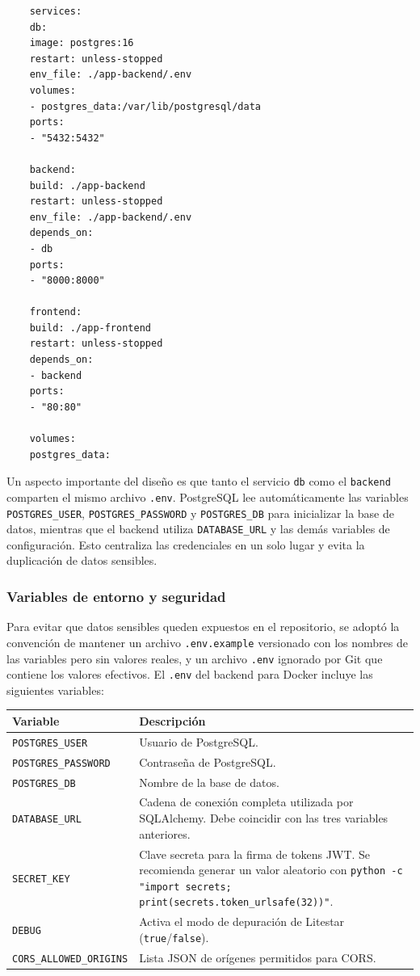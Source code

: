 \begin{lstlisting}
	services:
	db:
	image: postgres:16
	restart: unless-stopped
	env_file: ./app-backend/.env
	volumes:
	- postgres_data:/var/lib/postgresql/data
	ports:
	- "5432:5432"
	
	backend:
	build: ./app-backend
	restart: unless-stopped
	env_file: ./app-backend/.env
	depends_on:
	- db
	ports:
	- "8000:8000"
	
	frontend:
	build: ./app-frontend
	restart: unless-stopped
	depends_on:
	- backend
	ports:
	- "80:80"
	
	volumes:
	postgres_data:
\end{lstlisting}

Un aspecto importante del diseño es que tanto el servicio \texttt{db} como el \texttt{backend}
comparten el mismo archivo \texttt{.env}. PostgreSQL lee automáticamente las variables
\texttt{POSTGRES\_USER}, \texttt{POSTGRES\_PASSWORD} y \texttt{POSTGRES\_DB} para
inicializar la base de datos, mientras que el backend utiliza \texttt{DATABASE\_URL} y las
demás variables de configuración. Esto centraliza las credenciales en un solo lugar y evita
la duplicación de datos sensibles.

\subsubsection*{Variables de entorno y seguridad}

Para evitar que datos sensibles queden expuestos en el repositorio, se adoptó la convención
de mantener un archivo \texttt{.env.example} versionado con los nombres de las variables pero
sin valores reales, y un archivo \texttt{.env} ignorado por Git que contiene los valores
efectivos. El \texttt{.env} del backend para Docker incluye las siguientes variables:

\begin{center}
	\begin{tabular}{lp{9cm}}
		\hline
		\textbf{Variable} & \textbf{Descripción} \\
		\hline
		\texttt{POSTGRES\_USER}           & Usuario de PostgreSQL. \\
		\texttt{POSTGRES\_PASSWORD}       & Contraseña de PostgreSQL. \\
		\texttt{POSTGRES\_DB}             & Nombre de la base de datos. \\
		\texttt{DATABASE\_URL}            & Cadena de conexión completa utilizada por SQLAlchemy.
		Debe coincidir con las tres variables anteriores. \\
		\texttt{SECRET\_KEY}              & Clave secreta para la firma de tokens JWT.
		Se recomienda generar un valor aleatorio con
		\texttt{python -c "import secrets;
			print(secrets.token\_urlsafe(32))"}. \\
		\texttt{DEBUG}                    & Activa el modo de depuración de Litestar
		(\texttt{true}/\texttt{false}). \\
		\texttt{CORS\_ALLOWED\_ORIGINS}   & Lista JSON de orígenes permitidos para CORS. \\
		\hline
	\end{tabular}
\end{center}

